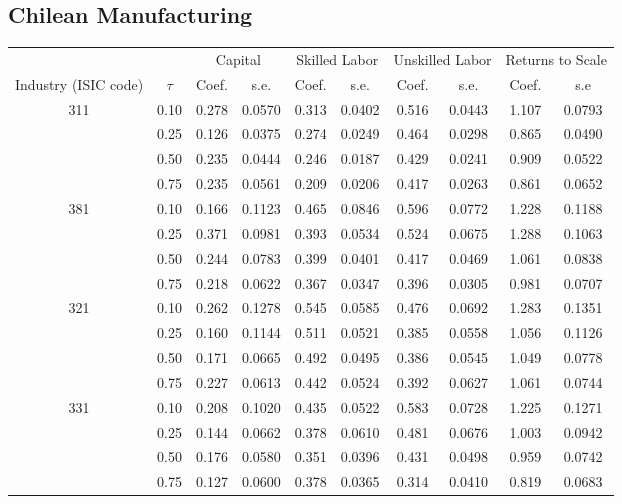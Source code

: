 \documentclass[11pt]{article}
\begin{document}
\subsection{Chilean Manufacturing}
\begin{table}[H]
\centering
\begin{tabular}{cccccccccc}
  \hline\hline & & \multicolumn{2}{c}{Capital}  & \multicolumn{2}{c}{Skilled Labor} & \multicolumn{2}{c}{Unskilled Labor} & \multicolumn{2}{c}{Returns to Scale} \\ \cmidrule(lr){3-4} \cmidrule(lr){5-6} \cmidrule(lr){7-8} \cmidrule(lr){9-10}Industry (ISIC code) & $\tau$ & Coef. & s.e. & Coef. & s.e. & Coef. & s.e. & Coef. & s.e \\ 
  \hline
311 & 0.10 & 0.278 & 0.0570 & 0.313 & 0.0402 & 0.516 & 0.0443 & 1.107 & 0.0793 \\ 
   & 0.25 & 0.126 & 0.0375 & 0.274 & 0.0249 & 0.464 & 0.0298 & 0.865 & 0.0490 \\ 
   & 0.50 & 0.235 & 0.0444 & 0.246 & 0.0187 & 0.429 & 0.0241 & 0.909 & 0.0522 \\ 
   & 0.75 & 0.235 & 0.0561 & 0.209 & 0.0206 & 0.417 & 0.0263 & 0.861 & 0.0652 \\ 
  381 & 0.10 & 0.166 & 0.1123 & 0.465 & 0.0846 & 0.596 & 0.0772 & 1.228 & 0.1188 \\ 
   & 0.25 & 0.371 & 0.0981 & 0.393 & 0.0534 & 0.524 & 0.0675 & 1.288 & 0.1063 \\ 
   & 0.50 & 0.244 & 0.0783 & 0.399 & 0.0401 & 0.417 & 0.0469 & 1.061 & 0.0838 \\ 
   & 0.75 & 0.218 & 0.0622 & 0.367 & 0.0347 & 0.396 & 0.0305 & 0.981 & 0.0707 \\ 
  321 & 0.10 & 0.262 & 0.1278 & 0.545 & 0.0585 & 0.476 & 0.0692 & 1.283 & 0.1351 \\ 
   & 0.25 & 0.160 & 0.1144 & 0.511 & 0.0521 & 0.385 & 0.0558 & 1.056 & 0.1126 \\ 
   & 0.50 & 0.171 & 0.0665 & 0.492 & 0.0495 & 0.386 & 0.0545 & 1.049 & 0.0778 \\ 
   & 0.75 & 0.227 & 0.0613 & 0.442 & 0.0524 & 0.392 & 0.0627 & 1.061 & 0.0744 \\ 
  331 & 0.10 & 0.208 & 0.1020 & 0.435 & 0.0522 & 0.583 & 0.0728 & 1.225 & 0.1271 \\ 
   & 0.25 & 0.144 & 0.0662 & 0.378 & 0.0610 & 0.481 & 0.0676 & 1.003 & 0.0942 \\ 
   & 0.50 & 0.176 & 0.0580 & 0.351 & 0.0396 & 0.431 & 0.0498 & 0.959 & 0.0742 \\ 
   & 0.75 & 0.127 & 0.0600 & 0.378 & 0.0365 & 0.314 & 0.0410 & 0.819 & 0.0683 \\ 
   \hline
\end{tabular}
\end{table}
\end{document}
